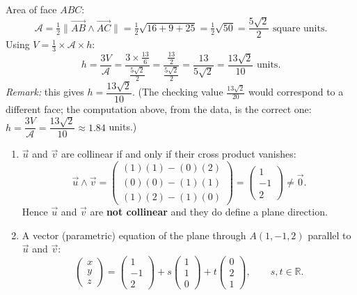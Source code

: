 \documentclass[11pt]{article}
\begin{document}
\begin{corrige}
\begin{enumerate}
\[\]
Area of face $ABC$:
\[
\mathcal{A} = \tfrac{1}{2}\|\vec{AB} \wedge \vec{AC}\| = \tfrac{1}{2}\sqrt{16 + 9 + 25} = \tfrac{1}{2}\sqrt{50} = \frac{5\sqrt{2}}{2} \text{ square units}.
\]
Using $V = \tfrac{1}{3} \times \mathcal{A} \times h$:
\[
h = \frac{3V}{\mathcal{A}} = \frac{3 \times \frac{13}{6}}{\frac{5\sqrt{2}}{2}} = \frac{\frac{13}{2}}{\frac{5\sqrt{2}}{2}} = \frac{13}{5\sqrt{2}} = \frac{13\sqrt{2}}{10} \text{ units}.
\]
\emph{Remark:} this gives $h = \dfrac{13\sqrt{2}}{10}$. (The checking value $\frac{13\sqrt{2}}{20}$ would correspond to a different face; the computation above, from the data, is the correct one: $h = \dfrac{3V}{\mathcal{A}} = \dfrac{13\sqrt{2}}{10} \approx 1.84$ units.)
\end{enumerate}
\end{corrige}

\begin{corrige}
\begin{enumerate}
\item $\vec{u}$ and $\vec{v}$ are collinear if and only if their cross product vanishes:
\[
\vec{u} \wedge \vec{v} = \begin{pmatrix} (1)(1) - (0)(2) \\ (0)(0) - (1)(1) \\ (1)(2) - (1)(0) \end{pmatrix} = \begin{pmatrix} 1 \\ -1 \\ 2 \end{pmatrix} \neq \vec{0}.
\]
Hence $\vec{u}$ and $\vec{v}$ are \textbf{not collinear} and they do define a plane direction.
\item A vector (parametric) equation of the plane through $A(1, -1, 2)$ parallel to $\vec{u}$ and $\vec{v}$:
\[
\begin{pmatrix} x \\ y \\ z \end{pmatrix} = \begin{pmatrix} 1 \\ -1 \\ 2 \end{pmatrix} + s\begin{pmatrix} 1 \\ 1 \\ 0 \end{pmatrix} + t\begin{pmatrix} 0 \\ 2 \\ 1 \end{pmatrix}, \qquad s, t \in \mathbb{R}.
\]
\end{enumerate}
\end{corrige}
\end{document}
